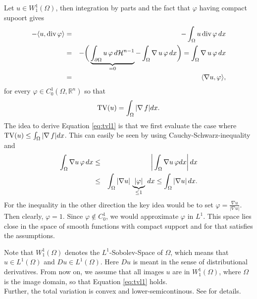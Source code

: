     \begin{example} %
    \label{prop:u_is_smooth}

        Let $u \in W_{1}^{1}(\Omega)$, then integration by parts and the fact that $\varphi$ having compact supoort gives
            \begin{eqnarray}
                -\langle u, \textnormal{div}\,\varphi \rangle &=& - \int_{\Omega} u\, \textnormal{div}\, \varphi\, dx \notag \\
                &=& - \bigg( \underbrace{\int_{\partial\Omega} u\, \varphi\, d\mathcal{H}^{n-1}}_{= 0} - \int_{\Omega} \nabla\,u\, \varphi\, dx \bigg) = \int_{\Omega} \nabla\,u\,\varphi\,dx \notag \\
                &=& \langle \nabla u, \varphi \rangle,
                \label{eq:nabla_equals_minus_divergence}
            \end{eqnarray}
        for every $\varphi \in C^{1}_{0}(\Omega, \mathbb{R}^{n})$ so that
            \begin{equation}
                \textnormal{TV}(u) = \int_{\Omega} |\nabla\,f| dx.
                \label{eq:tvl1}
            \end{equation}
        The idea to derive Equation \ref{eq:tvl1} is that we first evaluate the case where\\
        $\textnormal{TV}(u) \le \int_{\Omega} |\nabla\,f| dx$. This can easily be seen by using Cauchy-Schwarz-inequality and
            \begin{eqnarray}
                \int_{\Omega} \nabla u \, \varphi \, dx &\le& \bigg| \int_{\Omega} \nabla u \, \varphi dx \bigg| \, dx \notag \\
                &\le& \int_{\Omega} |\nabla u| \, \underbrace{|\varphi|}_{\le 1} \, dx \le \int_{\Omega} |\nabla u| \, dx.
            \end{eqnarray}
        For the inequality in the other direction the key idea would be to set $\varphi = \frac{\nabla u}{|\nabla u|}$. Then clearly, $\varphi = 1$. Since $\varphi \notin C_{0}^{1}$, we would approximate $\varphi$ in $L^{1}$. This space lies close in the space of smooth functions with compact support and for that satisfies the assumptions.

    \end{example}

    \begin{remark}
        Note that $W_{1}^{1}(\Omega)$ denotes the $L^{1}$-Sobolev-Space of $\Omega$, which means that $u \in L^{1}(\Omega)$ and $Du \in L^{1}(\Omega)$. Here $Du$ is meant in the sense of distributional derivatives. From now on, we assume that all images $u$ are in $W_{1}^{1}(\Omega)$, where $\Omega$ is the image domain, so that Equation \ref{eq:tvl1} holds. \\
        Further, the total variation is convex and lower-semicontinous. See \cite{Chambolle-et-al-10} for details.
    \end{remark}

